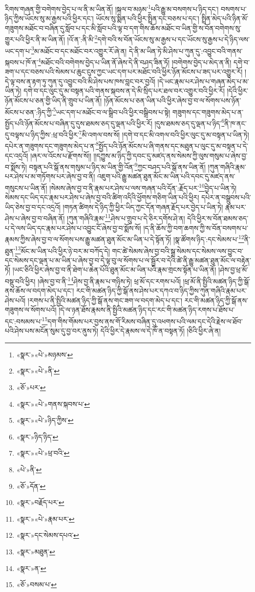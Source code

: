 རིགས་གཞན་གྱི་བགེགས་བྱེད་པ་ལ་ནི་མ་ཡིན་ནོ། །སྐལ་བ་མཉམ་\footnote{«སྣར་»«པེ་»མཉམས་}པའི་རྒྱུ་མ་བསགས་པ་ཉིད་དང་། བསགས་པ་ཉིད་ཀྱིས་ཡོངས་སུ་མ་རྒྱས་པའི་ཕྱིར་དང་། ཡོངས་སུ་སྨིན་པའི་ཕྱིར་སྤྲིན་དང་བཅས་པ་དང་། སྤྲིན་མེད་པའི་ཉིན་མོ་གཟུགས་མཐོང་བ་བཞིན་དུ་སློབ་པ་དང་མི་སློབ་པའི་ལྟ་བ་དག་གིས་ཆོས་མཐོང་བ་ཡིན་གྱི་ས་བོན་བགེགས་སུ་གྱུར་པའི་ཕྱིར་ནི་མ་ཡིན་ནོ། །འོ་ན་:ནི་མི་\footnote{«སྣར་»«པེ་»ནི་}དགེ་བའི་ས་བོན་ཡོངས་སུ་མ་རྒྱས་པ་དང་ཡོངས་སུ་རྒྱས་པ་དེ་ཉིད་ལས་ཡང་དག་པ་\footnote{«ཅོ་»པར་}མ་མཐོང་བ་དང་མཐོང་བར་འགྱུར་རོ་ཞེ་ན། དེ་ནི་མ་ཡིན་ཏེ་མི་ཤེས་པ་ཀུན་དུ་:འབྱུང་བའི་གནས་སྐབས་པ་ཁོ་ན་\footnote{«སྣར་»«པེ་»གནས་སྐབས་པ་}མཐོང་བའི་བགེགས་བྱེད་པ་ཡིན་ནོ་ཞེས་དེ་ནི་བཤད་ཟིན་ཏོ། །བགེགས་བྱེད་པ་མེད་ན་ནི། དགེ་བ་ཟག་པ་དང་བཅས་པའི་སེམས་པ་ཆུང་ངུས་ཀྱང་ཡང་དག་པར་མཐོང་བའི་ཕྱིར་ཉོན་མོངས་པ་ཟད་པར་འགྱུར་རོ། །དེ་ལྟ་བས་ན་རྟག་ཏུ་ཀུན་དུ་འབྱུང་བའི་མི་ཤེས་པས་ཁས་བླང་བར་བྱའོ། །དེ་ཡང་རྣམ་པར་ཤེས་པ་གཞན་མེད་པ་མ་ཡིན་ཏེ། དགེ་བ་དང་ལུང་དུ་མ་བསྟན་པའི་གནས་སྐབས་ན་དེ་མི་སྲིད་པར་ཐལ་བར་འགྱུར་བའི་ཕྱིར་རོ། །དེའི་ཕྱིར་ཉོན་མོངས་པ་ཅན་གྱི་ཡིད་ནི་གྲུབ་པ་ཡིན་ནོ། །ཉོན་མོངས་པ་ཅན་ཡིན་པའི་ཕྱིར་ཞེས་བྱ་བ་ལ་སོགས་པས་ཉོན་མོངས་པ་ཅན་:ཉིད་ཀྱི་\footnote{«སྣར་»«པེ་»ཉིད་ཀྱིས་}ཡང་དག་པ་མཐོང་བ་ལ་སྒྲིབ་པའི་ཕྱིར་བསྒྲིབས་པ་སྟེ། གཟུགས་དང་གཟུགས་མེད་པ་ན་སྤྱོད་པའི་ཉོན་མོངས་པ་བཞིན་དུ་དུས་ཐམས་ཅད་དུ་ལྡན་པའི་ཕྱིར་རོ། །དུས་ཐམས་ཅད་དུ་ལྡན་པ་ཉིད་\footnote{«སྣར་»ཉིད་ཉིད་}ནི་ཁ་ནང་དུ་བལྟས་པ་ཉིད་ཀྱིས་:ཕྲ་བའི་ཕྱིར་\footnote{«སྣར་»«པེ་»ཕྲ་བའི་}མི་འགལ་བས་སོ། །དགེ་བ་དང་མི་འགལ་བའི་ཕྱིར་ལུང་དུ་མ་བསྟན་པ་ཡིན་ཏེ། དཔེར་ན་གཟུགས་དང་གཟུགས་མེད་པ་ན་\footnote{«པེ་»ནི་}སྤྱོད་པའི་ཉོན་མོངས་པ་ཞི་གནས་དང་མཐུན་པ་ལུང་དུ་མ་བསྟན་པ་དེ་དང་འདྲའོ། །ཞར་ལ་འོངས་པ་རྫོགས་སོ།། །།དཀྱུས་མ་ཉིད་ཀྱི་དབང་དུ་མཛད་ནས་སེམས་ཀྱི་ལུས་གསུམ་པ་ཞེས་བྱ་བ་སྨོས་ཏེ། བསྟན་པའི་སྒོ་ནས་གསུམ་པ་ཉིད་མ་ཡིན་གྱི་འོན་\footnote{«ཅོ་»དོན་}ཀྱང་བཤད་པའི་སྒོ་ནས་ཡིན་ནོ། །ཀུན་གཞིའི་རྣམ་པར་ཤེས་པ་མ་གཏོགས་པར་ཞེས་བྱ་བ་ནི། འཇུག་པའི་རྒྱུ་མཚན་ཐུན་མོང་མ་ཡིན་པའི་དབང་དུ་མཛད་ནས་གསུངས་པ་ཡིན་ནོ། །སེམས་ཞེས་བྱ་བ་ནི་རྣམ་པར་ཤེས་པ་ལས་གཞན་པའི་དོན་:རྗོད་པར་\footnote{«སྣར་»བརྗོད་པར་}བྱེད་པ་ཡིན་ཏེ། སེམས་དང་ཡིད་དང་རྣམ་པར་ཤེས་པ་ཞེས་བྱ་བའི་ཚིག་འདིའི་ཕྱོགས་གཅིག་ཡིན་པའི་ཕྱིར། དཔེར་ན་བསྒྲུབས་པའི་ཡིད་ཅེས་བྱ་བ་དང་འདྲའོ། །གཏན་ཚིགས་དེ་ཉིད་ཀྱི་ཕྱིར་ཡིད་ཀྱང་དོན་གཞན་རྗོད་པར་བྱེད་པ་ཡིན་ཏེ། རྣམ་པར་ཤེས་པ་ཞེས་བྱ་བ་བཞིན་ནོ། །ཀུན་གཞིའི་རྣམ་\footnote{«སྣར་»«པེ་»རྣམ་པར་}ཤེས་པ་གྲུབ་པ་དེ་ཅིར་དགོས་ཤེ་ན། དེའི་ཕྱིར་ས་བོན་ཐམས་ཅད་པ་དེ་ལས་ཡིད་དང་རྣམ་པར་ཤེས་པ་འབྱུང་ངོ་ཞེས་བྱ་བ་སྨོས་སོ། །ད་ནི་ཆོས་ཀྱི་བག་ཆགས་ཀྱི་ས་བོན་བསགས་པ་རྣམས་ཀྱིས་ཞེས་བྱ་བ་ལ་སོགས་པས་རྒྱུ་མཚན་ཐུན་མོང་མ་ཡིན་པ་དེ་སྟོན་ཏོ། །སྣ་ཚོགས་ཉིད་:དང་སེམས་པ་\footnote{«སྣར་»དང་སེམས་དཔའ་}ནི་ཐུན་\footnote{«སྣར་»མཐུན་}མོང་མ་ཡིན་པའི་ཕྱིར་ཉེ་བར་མ་བཀོད་དེ། གང་ཚེ་སེམས་ཞེས་བྱ་བའི་སྒྲ་སེམས་དང་སེམས་ལས་བྱུང་བ་དང་སེམས་དང་ལྡན་པ་མ་ཡིན་པ་ཞེས་བྱ་བ་དེ་ལྟ་བུ་ལ་སོགས་པ་ལ་སྦྱོར་བ་དེའི་ཚེ་ནི་རྒྱུ་མཚན་ཐུན་མོང་ལ་བརྟེན་ཏོ། །ཡང་ཅིའི་ཕྱིར་ཞེས་བྱ་བ་ནི་ཐེག་པ་ཆེན་པོའི་ཐུན་མོང་མ་ཡིན་པའི་རྣམ་གྲངས་སྟོན་པ་ཡིན་ནོ། །ཤེས་བྱ་ཕྲ་མོ་བསྡུ་བའི་ཕྱིར། །ཞེས་བྱ་བ་ནི་\footnote{«སྣར་»ན་}ཤེས་བྱ་ནི་རྣམ་པ་གཉིས་ཏེ། ཕྲ་མོ་དང་རགས་པའོ། །ཕྲ་མོ་ནི་སྤྱིའི་མཚན་ཉིད་ཀྱི་སྒོ་ནས་ཆོས་ལ་བདག་མེད་པ་དང་། རང་གི་མཚན་ཉིད་ཀྱི་སྒོ་ནས་ཤེས་པར་དཀའ་བ་ཉིད་ཀྱིས་ཀུན་གཞིའི་རྣམ་པར་ཤེས་པའོ། །རགས་པ་ནི་སྤྱིའི་མཚན་ཉིད་ཀྱི་སྒོ་ནས་གང་ཟག་ལ་བདག་མེད་པ་དང་། རང་གི་མཚན་ཉིད་ཀྱི་སྒོ་ནས་གཟུགས་ལ་སོགས་པའོ། །དེ་ལ་ཉན་ཐོས་རྣམས་ནི་སྤྱིའི་མཚན་ཉིད་དང་རང་གི་མཚན་ཉིད་རགས་པ་ཐོས་པ་དང་:བསམས་པ་\footnote{«ཅོ་»བསམ་པ་}དག་གིས་གོམས་པར་བྱས་ནས་གོ་རིམས་བཞིན་དུ་འཕགས་པའི་ལམ་དང་དེའི་རྗེས་ལ་ཐོབ་པའི་ཤེས་པས་མངོན་སུམ་དུ་བྱ་བར་ནུས་ཏེ། དེའི་ཕྱིར་དེ་རྣམས་ལ་དེ་ཁོ་ན་བསྟན་ཏོ། །ཅིའི་ཕྱིར་ཞེ་ན། 